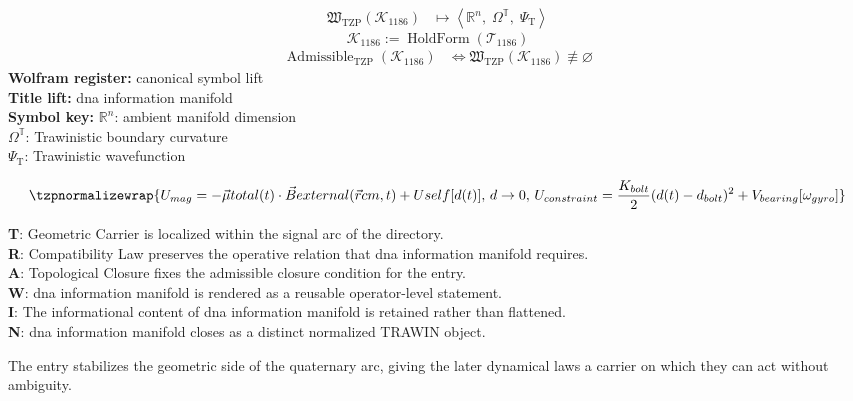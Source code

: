 \noindent
\begin{minipage}[t]{0.48\linewidth}
\begingroup
\small
\[
\begin{aligned}
\mathfrak{W}_{\mathrm{TZP}}\!\left(\mathcal{K}_{1186}\right)
&\longmapsto
\left\langle \mathbb{R}^{n},\; \Omega^{\mathbb{T}},\; \Psi_{\mathrm{T}} \right\rangle
\end{aligned}
\]
\[
\mathcal{K}_{1186}
:=
\operatorname{HoldForm}\!\left(\mathcal{T}_{1186}\right)
\]
\[
\begin{aligned}
\operatorname{Admissible}_{\mathrm{TZP}}\!\left(\mathcal{K}_{1186}\right)
&\Longleftrightarrow
\mathfrak{W}_{\mathrm{TZP}}\!\left(\mathcal{K}_{1186}\right)\not\equiv\varnothing
\end{aligned}
\]
\textbf{Wolfram register:} canonical symbol lift\\
\textbf{Title lift:} dna information manifold\\
\textbf{Symbol key:} \(\mathbb{R}^{n}\): ambient manifold dimension\\ \(\Omega^{\mathbb{T}}\): Trawinistic boundary curvature\\ \(\Psi_{\mathrm{T}}\): Trawinistic wavefunction
\par
\endgroup
\end{minipage}\hfill
\begin{minipage}[t]{0.48\linewidth}
\[
\tzpnormalizewrap{U_{mag} = -\vec{\mu} {total}(t) \cdot \vec{B} {external}(\vec{r} {cm}, t) + U {self}[d(t)],\,d \to 0,\,U_{constraint} = \frac{K_{bolt}}{2}(d(t)-d_{bolt})^{2} + V_{bearing}[\omega_{gyro}]}
\]

\small
\textbf{T}: Geometric Carrier is localized within the signal arc of the directory.\\
\textbf{R}: Compatibility Law preserves the operative relation that dna information manifold requires.\\
\textbf{A}: Topological Closure fixes the admissible closure condition for the entry.\\
\textbf{W}: dna information manifold is rendered as a reusable operator-level statement.\\
\textbf{I}: The informational content of dna information manifold is retained rather than flattened.\\
\textbf{N}: dna information manifold closes as a distinct normalized TRAWIN object.
\normalsize
\end{minipage}

The entry stabilizes the geometric side of the quaternary arc, giving the later dynamical laws a carrier on which they can act without ambiguity.
\clearpage

